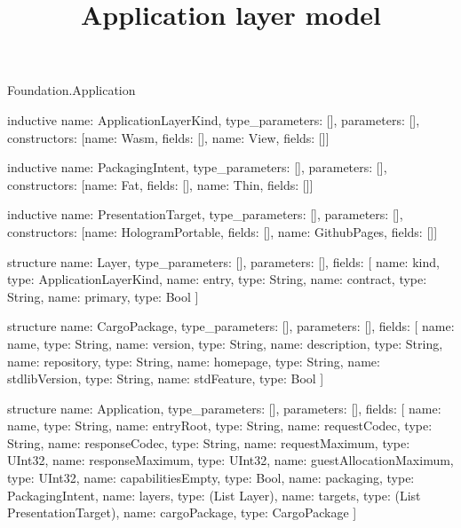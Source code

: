 \begin{lexlean}{Foundation.Application}
\title{Application layer model}
\begin{semanticmodule}
inductive{
  name: ApplicationLayerKind,
  type_parameters: [],
  parameters: [],
  constructors: [{name: Wasm, fields: []}, {name: View, fields: []}]
}

inductive{
  name: PackagingIntent,
  type_parameters: [],
  parameters: [],
  constructors: [{name: Fat, fields: []}, {name: Thin, fields: []}]
}

inductive{
  name: PresentationTarget,
  type_parameters: [],
  parameters: [],
  constructors: [{name: HologramPortable, fields: []}, {name: GithubPages, fields: []}]
}

structure{
  name: Layer,
  type_parameters: [],
  parameters: [],
  fields: [
    {name: kind, type: ApplicationLayerKind},
    {name: entry, type: String},
    {name: contract, type: String},
    {name: primary, type: Bool}
  ]
}

structure{
  name: CargoPackage,
  type_parameters: [],
  parameters: [],
  fields: [
    {name: name, type: String},
    {name: version, type: String},
    {name: description, type: String},
    {name: repository, type: String},
    {name: homepage, type: String},
    {name: stdlibVersion, type: String},
    {name: stdFeature, type: Bool}
  ]
}

structure{
  name: Application,
  type_parameters: [],
  parameters: [],
  fields: [
    {name: name, type: String},
    {name: entryRoot, type: String},
    {name: requestCodec, type: String},
    {name: responseCodec, type: String},
    {name: requestMaximum, type: UInt32},
    {name: responseMaximum, type: UInt32},
    {name: guestAllocationMaximum, type: UInt32},
    {name: capabilitiesEmpty, type: Bool},
    {name: packaging, type: PackagingIntent},
    {name: layers, type: (List Layer)},
    {name: targets, type: (List PresentationTarget)},
    {name: cargoPackage, type: CargoPackage}
  ]
}
\end{semanticmodule}
\end{lexlean}
